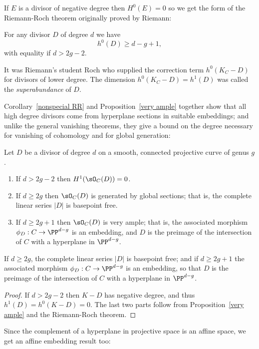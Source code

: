 If $E$ is a divisor of negative degree then $H^0(E) = 0$ so we get the form of the Riemann-Roch theorem
originally proved by Riemann:

\begin{corollary}\label{nonspecial RR}
For any divisor $D$ of degree $d$ we have
$$
h^0(D) \geq d - g + 1,
$$
with equality if $d > 2g-2$.
\end{corollary}
It was Riemann's student Roch  who supplied the correction term $h^0(K_C - D)$ for divisors of lower degree.
The dimension $h^0(K_C-D) = h^1(D)$ was called the \emph{superabundance} of $D$.

Corollary~\ref{nonspecial RR} and Proposition~\ref{very ample} together show that all high degree divisors come from hyperplane sections in 
suitable embeddings; and unlike the general vanishing theorems, they give a bound on the degree necessary for vanishing
of cohomology and for
global generation:

\begin{corollary}\label{degree 2g+1 embedding}
Let $D$ be a divisor of degree $d$ on a smooth, connected projective curve of genus $g$.
\begin{enumerate}
 \item If $d>2g-2$ then $H^1(\sO_C(D)) = 0$.
 \item If $d \geq 2g$ then $\sO_C(D)$ is generated by global sections; that is, the complete linear series $|D|$ is basepoint free.
 \item If $d \geq 2g+1$ then $\sO_C(D)$ is very ample; that is, the associated morphism $\phi_D : C \to \PP^{d-g}$ is an embedding, and
$D$ is the preimage of the intersection of $C$ with a hyperplane in $ \PP^{d-g}$.
\end{enumerate}
 If $d \geq 2g$, the complete linear series $|D|$ is basepoint free; and if $d \geq 2g+1$ the associated morphism $\phi_D : C \to \PP^{d-g}$ is an embedding, so that
$D$ is the preimage of the intersection of $C$ with a hyperplane in $ \PP^{d-g}$.
\end{corollary}

\begin{proof}
If $d>2g-2$ then $K-D$ has negative degree, and thus $h^1(D) = h^0(K-D) = 0.$ The last two parts follow
from Proposition~\ref{very ample} and the Riemann-Roch theorem.
\end{proof}

Since the complement of a hyperplane in projective space is an affine space, we get an affine embedding result too:

